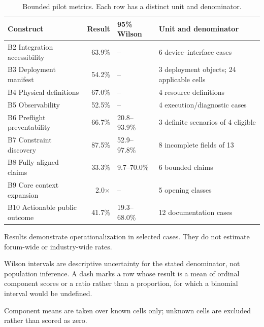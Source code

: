 \begin{table}[t]
\centering
\caption{Bounded pilot metrics. Each row has a distinct unit and denominator.}
\label{tab:headline-metrics}
\begin{threeparttable}
\begin{tabularx}{\linewidth}{@{}L r l L@{}}
\toprule
Construct & Result & 95\% Wilson & Unit and denominator \\
\midrule
B2 Integration accessibility & 63.9\% & -- & 6 device--interface cases \\
B3 Deployment manifest & 54.2\% & -- & 3 deployment objects; 24 applicable cells \\
B4 Physical definitions & 67.0\% & -- & 4 resource definitions \\
B5 Observability & 52.5\% & -- & 4 execution/diagnostic cases \\
B6 Preflight preventability & 66.7\% & 20.8--93.9\% & 3 definite scenarios of 4 eligible \\
B7 Constraint discovery & 87.5\% & 52.9--97.8\% & 8 incomplete fields of 13 \\
B8 Fully aligned claims & 33.3\% & 9.7--70.0\% & 6 bounded claims \\
B9 Core context expansion & 2.0$\times$ & -- & 5 opening classes \\
B10 Actionable public outcome & 41.7\% & 19.3--68.0\% & 12 documentation cases \\
\bottomrule
\end{tabularx}
\begin{tablenotes}[flushleft]\footnotesize
\item Results demonstrate operationalization in selected cases. They do not estimate forum-wide or industry-wide rates.
\item Wilson intervals are descriptive uncertainty for the stated denominator, not population inference. A dash marks a row whose result is a mean of ordinal component scores or a ratio rather than a proportion, for which a binomial interval would be undefined.
\item Component means are taken over known cells only; unknown cells are excluded rather than scored as zero.
\end{tablenotes}
\end{threeparttable}
\end{table}
